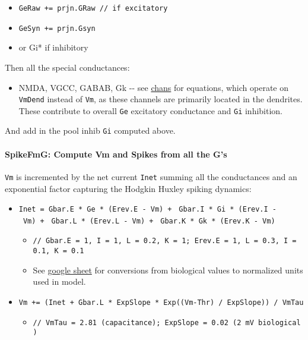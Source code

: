 \documentclass[11pt,twoside]{article}
\newif\myifpdf
\begin{document}
\begin{itemize}
\tightlist
\item
  \texttt{GeRaw\ +=\ prjn.GRaw\ //\ if\ excitatory}
\item
  \texttt{GeSyn\ +=\ prjn.Gsyn}
\item
  or Gi* if inhibitory
\end{itemize}

Then all the special conductances:

\begin{itemize}
\tightlist
\item
  NMDA, VGCC, GABAB, Gk -\/- see
  \href{https://github.com/emer/axon/tree/master/chans}{chans} for
  equations, which operate on \texttt{VmDend} instead of \texttt{Vm}, as
  these channels are primarily located in the dendrites. These
  contribute to overall \texttt{Ge} excitatory conductance and
  \texttt{Gi} inhibition.
\end{itemize}

And add in the pool inhib \texttt{Gi} computed above.

\hypertarget{spikefmg-compute-vm-and-spikes-from-all-the-gs}{%
\paragraph{SpikeFmG: Compute Vm and Spikes from all the
G's}\label{spikefmg-compute-vm-and-spikes-from-all-the-gs}}

\texttt{Vm} is incremented by the net current \texttt{Inet} summing all
the conductances and an exponential factor capturing the Hodgkin Huxley
spiking dynamics:

\begin{itemize}
\tightlist
\item
  \texttt{Inet\ =\ Gbar.E\ *\ Ge\ *\ (Erev.E\ -\ Vm)\ +\ }
  \texttt{Gbar.I\ *\ Gi\ *\ (Erev.I\ -\ Vm)\ +\ }
  \texttt{Gbar.L\ *\ (Erev.L\ -\ Vm)\ +\ }
  \texttt{Gbar.K\ *\ Gk\ *\ (Erev.K\ -\ Vm)}

  \begin{itemize}
  \tightlist
  \item
    \texttt{//\ Gbar.E\ =\ 1,\ I\ =\ 1,\ L\ =\ 0.2,\ K\ =\ 1;\ Erev.E\ =\ 1,\ L\ =\ 0.3,\ I\ =\ 0.1,\ K\ =\ 0.1}
  \item
    See
    \href{https://docs.google.com/spreadsheets/d/1jn-NcXY4-y3pOw6inFOgPYlaQodrGIjcsAWkiD9f1FQ/edit?usp=sharing}{google
    sheet} for conversions from biological values to normalized units
    used in model.
  \end{itemize}
\item
  \texttt{Vm\ +=\ (Inet\ +\ Gbar.L\ *\ ExpSlope\ *\ Exp((Vm-Thr)\ /\ ExpSlope))\ /\ VmTau}

  \begin{itemize}
  \tightlist
  \item
    \texttt{//\ VmTau\ =\ 2.81\ (capacitance);\ ExpSlope\ =\ 0.02\ (2\ mV\ biological)}
  \end{itemize}
\end{itemize}
\end{document}

